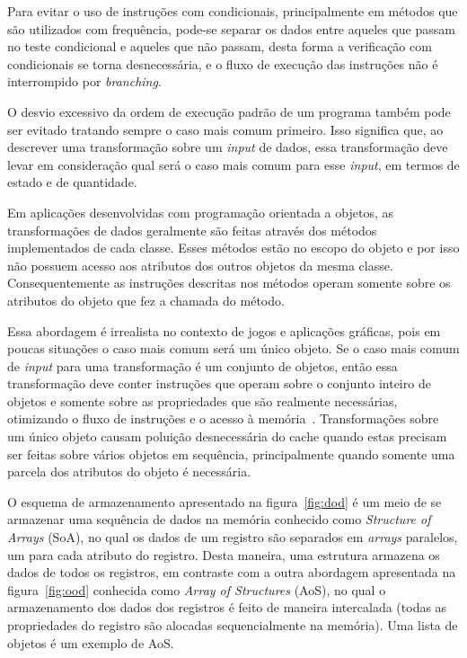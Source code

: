 Para evitar o uso de instruções com condicionais, principalmente em 
métodos que são utilizados com frequência, pode-se separar os dados entre 
aqueles que passam no teste condicional e aqueles que não passam, desta 
forma a verificação com condicionais se torna desnecessária, e o fluxo de 
execução das instruções não é interrompido por \textit{branching}.

O desvio excessivo da ordem de execução padrão de um programa 
também pode ser evitado tratando sempre o caso mais comum primeiro.
 Isso significa que, ao descrever uma transformação sobre um 
\textit{input} de dados, essa transformação deve levar em 
consideração qual será o caso mais comum para esse \textit{input}, 
em termos de estado e de quantidade. 

Em aplicações desenvolvidas com programação orientada a objetos, 
as transformações de dados geralmente são feitas através dos 
métodos implementados de cada classe. Esses métodos estão no 
escopo do objeto e por isso não possuem acesso aos atributos dos 
outros objetos da mesma classe. Consequentemente as instruções 
descritas nos métodos operam somente sobre os atributos do objeto 
que fez a chamada do método.

Essa abordagem é irrealista no contexto de jogos e aplicações 
gráficas, pois em poucas situações o caso mais comum será um 
único objeto. Se o caso mais
comum de \textit{input} para uma transformação é um conjunto 
de objetos, então essa transformação 
deve conter instruções que operam sobre o conjunto inteiro de 
objetos e somente sobre as propriedades que são realmente 
necessárias, otimizando o fluxo de instruções e o acesso à 
memória~\cite{fabiandod}. Transformações sobre um único objeto 
causam poluição desnecessária do cache quando estas precisam 
ser feitas sobre vários objetos em sequência, principalmente 
quando somente uma parcela dos atributos do objeto é 
necessária.

O esquema de armazenamento apresentado na 
figura~\ref{fig:dod} é um meio de se armazenar uma sequência de 
dados na memória conhecido como \textit{Structure of Arrays} (SoA), 
no qual os dados de um registro são separados em \textit{arrays} 
paralelos, um para cada atributo do registro. Desta maneira, uma 
estrutura armazena os dados de todos os registros, em contraste 
com a outra abordagem apresentada na figura~\ref{fig:ood} conhecida 
como \textit{Array of Structures} (AoS), no qual o armazenamento 
dos dados dos registros é feito de maneira intercalada (todas 
as propriedades do registro são alocadas sequencialmente na memória).
Uma lista de objetos é um exemplo de AoS.

